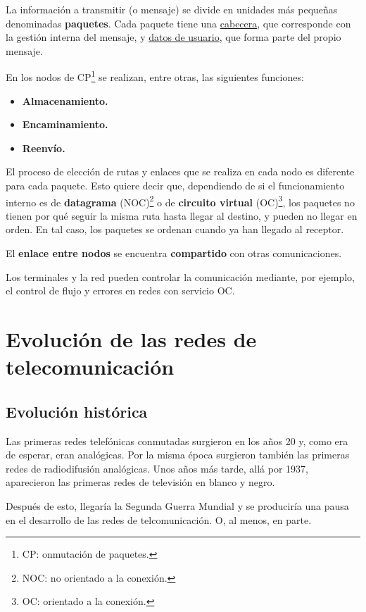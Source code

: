 \documentclass[a4paper]{book}
\numberwithin{figure}{chapter}
\numberwithin{equation}{subsection}
\begin{document}
La información a transmitir (o mensaje) se divide en unidades más pequeñas denominadas \textbf{paquetes}. Cada paquete tiene una \underline{cabecera}, que corresponde con la gestión interna del mensaje, y \underline{datos de usuario}, que forma parte del propio mensaje.

En los nodos de CP\footnote{CP: onmutación de paquetes.} se realizan, entre otras, las siguientes funciones:
\begin{itemize}
  \item \textbf{Almacenamiento.}
  \item \textbf{Encaminamiento.}
  \item \textbf{Reenvío.}
\end{itemize}

El proceso de elección de rutas y enlaces que se realiza en cada nodo es diferente para cada paquete. Esto quiere decir que, dependiendo de si el funcionamiento interno es de \textbf{datagrama} (NOC)\footnote{NOC: no orientado a la conexión.} o de \textbf{circuito virtual} (OC)\footnote{OC: orientado a la conexión.}, los paquetes no tienen por qué seguir la misma ruta hasta llegar al destino, y pueden no llegar en orden. En tal caso, los paquetes se ordenan cuando ya han llegado al receptor.

El \textbf{enlace entre nodos} se encuentra \textbf{compartido} con otras comunicaciones.

Los terminales y la red pueden controlar la comunicación mediante, por ejemplo, el control de flujo y errores en redes con servicio OC.



\section{Evolución de las redes de telecomunicación}

\subsection{Evolución histórica}
Las primeras redes telefónicas conmutadas surgieron en los años 20 y, como era de esperar, eran analógicas. Por la misma época surgieron también las primeras redes de radiodifusión analógicas. Unos años más tarde, allá por 1937, aparecieron las primeras redes de televisión en blanco y negro.

Después de esto, llegaría la Segunda Guerra Mundial y se produciría una pausa en el desarrollo de las redes de telcomunicación. O, al menos, en parte.
\end{document}
